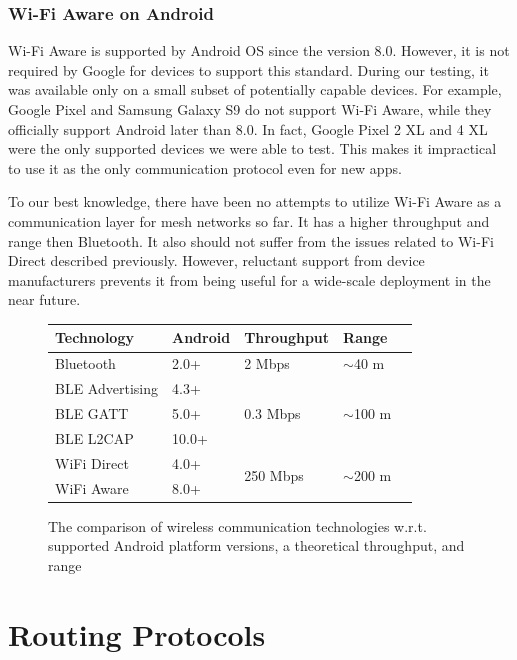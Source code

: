 \documentclass[conference,compsoc]{IEEEtran}
\begin{document}
\subsubsection{Wi-Fi Aware on Android}

Wi-Fi Aware is supported by Android OS since the version 8.0. However, it is not required by Google for devices to support this standard. During our testing, it was available only on a small subset of potentially capable devices. For example, Google Pixel and Samsung Galaxy S9 do not support Wi-Fi Aware, while they officially support Android later than 8.0. In fact, Google Pixel 2 XL and 4 XL were the only supported devices we were able to test. This makes it impractical to use it as the only communication protocol even for new apps.

To our best knowledge, there have been no attempts to utilize Wi-Fi Aware as a communication layer for mesh networks so far. It has a higher throughput and range then Bluetooth. It also should not suffer from the issues related to Wi-Fi Direct described previously. However, reluctant support from device manufacturers prevents it from being useful for a wide-scale deployment in the near future.


\begin{figure}
  \centering
  \begin{tabular}{ | l | l | l | l | l | }
    \hline
    Technology & Android & Throughput & Range \\
    \hline
    Bluetooth & 2.0+ & 2 Mbps & $\sim$40 m \\
    \hline
    BLE Advertising & 4.3+ & \multirow{3}{*}{0.3 Mbps} & \multirow{3}{*}{$\sim$100 m} \\
    BLE GATT & 5.0+ &  &  \\
    BLE L2CAP & 10.0+ &  &  \\
    \hline
    WiFi Direct & 4.0+ & \multirow{2}{*}{250 Mbps} & \multirow{2}{*}{$\sim$200 m} \\
    WiFi Aware & 8.0+ & & \\
    \hline
  \end{tabular}
  \caption{The comparison of wireless communication technologies w.r.t. supported Android platform versions, a theoretical throughput, and range}
\end{figure}

\section{Routing Protocols}\label{routing}
\end{document}
